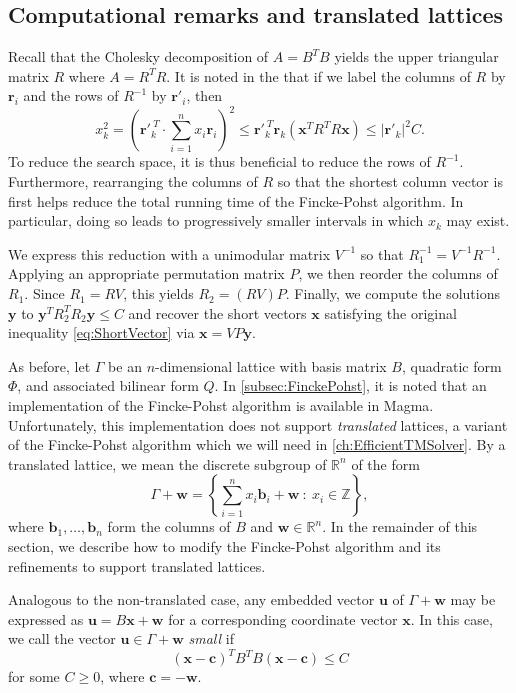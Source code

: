 \subsection{Computational remarks and translated lattices}
\label{subsec:FinckePohstRemarks}

Recall that the Cholesky decomposition of $A = B^TB$ yields the upper triangular matrix $R$ where $A = R^TR$. It is noted in the \cite{FP} that if we label the columns of $R$ by $\mathbf{r}_i$ and the rows of $R^{-1}$ by $\mathbf{r}'_i$, then 
\[x_k^2 = \left( \mathbf{r}'^{\ T}_k \cdot \sum_{i=1}^n x_i \mathbf{r}_i \right)^2 \leq \mathbf{r}'^{\ T}_k \mathbf{r}_k (\mathbf{x}^TR^TR\mathbf{x}) \leq | \mathbf{r}'_k |^2C.\]
To reduce the search space, it is thus beneficial to reduce the rows of $R^{-1}$. Furthermore, rearranging the columns of $R$ so that the shortest column vector is first helps reduce the total running time of the Fincke-Pohst algorithm. In particular, doing so leads to progressively smaller intervals in which $x_k$ may exist. 

We express this reduction with a unimodular matrix $V^{-1}$ so that $R_1^{-1} = V^{-1}R^{-1}$. Applying an appropriate permutation matrix $P$, we then reorder the columns of $R_1$. Since $R_1 = RV$, this yields $R_2 = (RV)P$. Finally, we compute the solutions $\mathbf{y}$ to $\mathbf{y}^TR_2^TR_2\mathbf{y}\leq C$ and recover the short vectors $\mathbf{x}$ satisfying the original inequality \eqref{eq:ShortVector} via $\mathbf{x} = VP\mathbf{y}$. 

As before, let $\Gamma$ be an $n$-dimensional lattice with basis matrix $B$, quadratic form $\Phi$, and associated bilinear form $Q$. In \autoref{subsec:FinckePohst}, it is noted that an implementation of the Fincke-Pohst algorithm is available in Magma. Unfortunately, this implementation does not support \textit{translated} lattices, a variant of the Fincke-Pohst algorithm which we will need in \autoref{ch:EfficientTMSolver}. By a translated lattice, we mean the discrete subgroup of $\mathbb{R}^n$ of the form
\[\Gamma + \mathbf{w} = \left\{ \sum_{i=1}^n x_i \mathbf{b}_i + \mathbf{w}\ : \ x_i \in \mathbb{Z} \right\},\]
where $\mathbf{b}_1, \dots, \mathbf{b}_n$ form the columns of $B$ and $\mathbf{w} \in \mathbb{R}^n$. In the remainder of this section, we describe how to modify the Fincke-Pohst algorithm and its refinements to support translated lattices. 

Analogous to the non-translated case, any embedded vector $\mathbf{u}$ of $\Gamma + \mathbf{w}$ may be expressed as $\mathbf{u} = B\mathbf{x} + \mathbf{w}$ for a corresponding coordinate vector $\mathbf{x}$. In this case, we call the vector $\mathbf{u} \in \Gamma + \mathbf{w}$ \textit{small} if 
\begin{equation} \label{eq:TransShortVector}
(\mathbf{x}-\mathbf{c})^TB^TB(\mathbf{x}-\mathbf{c}) \leq C
\end{equation}
for some $C \geq 0$, where $\mathbf{c} = -\mathbf{w}$. 

